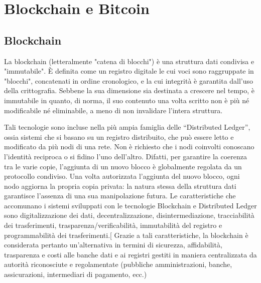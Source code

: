 \chapter{Blockchain e Bitcoin}
\section{Blockchain}
La blockchain (letteralmente "catena di blocchi") è una struttura dati condivisa e "immutabile". È definita come
un registro digitale le cui voci sono raggruppate in "blocchi", concatenati in ordine cronologico, e la cui integrità è
garantita dall'uso della crittografia. Sebbene la sua dimensione sia destinata a crescere nel tempo, è immutabile
in quanto, di norma, il suo contenuto una volta scritto non è più né modificabile né eliminabile, a meno di non
invalidare l'intera struttura.

\singlespacing

Tali tecnologie sono incluse nella più ampia famiglia delle “Distributed Ledger”, ossia sistemi che si basano su un
registro distribuito, che può essere letto e modificato da più nodi di una rete. Non è richiesto che i nodi coinvolti
conoscano l'identità reciproca o si fidino l'uno dell'altro. Difatti, per garantire la coerenza tra le varie copie,
l'aggiunta di un nuovo blocco è globalmente regolata da un protocollo condiviso. Una volta autorizzata l'aggiunta
del nuovo blocco, ogni nodo aggiorna la propria copia privata: la natura stessa della struttura dati garantisce
l'assenza di una sua manipolazione futura. Le caratteristiche che accomunano i sistemi sviluppati con le tecnologie
Blockchain e Distributed Ledger sono digitalizzazione dei dati, decentralizzazione, disintermediazione, tracciabilità
dei trasferimenti, trasparenza/verificabilità, immutabilità del registro e programmabilità dei trasferimenti.[
Grazie a tali caratteristiche, la blockchain è considerata pertanto un'alternativa in termini di sicurezza, affidabilità,
trasparenza e costi alle banche dati e ai registri gestiti in maniera centralizzata da autorità riconosciute e
regolamentate (pubbliche amministrazioni, banche, assicurazioni, intermediari di pagamento, ecc.)

\singlespacing

